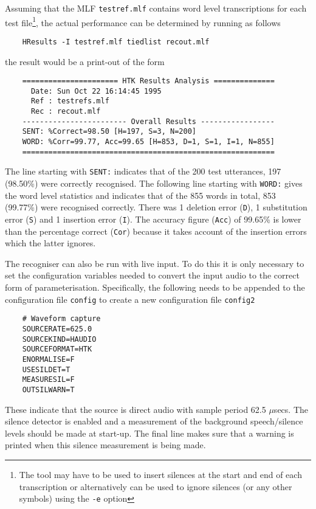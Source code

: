 Assuming that the MLF \texttt{testref.mlf} contains word level transcriptions
for each test file\footnote{The  tool may have to be used to insert silences 
at the start and end of each transcription or alternatively
 can be used to ignore silences (or any other symbols) using
the \texttt{-e} option}, the actual
performance can be determined by running 
 as follows
\begin{verbatim}
    HResults -I testref.mlf tiedlist recout.mlf
\end{verbatim}
the result would be a print-out of the form
\begin{verbatim}
    ====================== HTK Results Analysis ==============
      Date: Sun Oct 22 16:14:45 1995
      Ref : testrefs.mlf
      Rec : recout.mlf
    ------------------------ Overall Results -----------------
    SENT: %Correct=98.50 [H=197, S=3, N=200]
    WORD: %Corr=99.77, Acc=99.65 [H=853, D=1, S=1, I=1, N=855]
    ==========================================================
\end{verbatim}
The line starting with \texttt{SENT:} indicates that of the 200 test utterances,
197  (98.50\%) were correctly recognised.  The following line starting with \texttt{WORD:} 
gives the word level statistics and indicates that of the 855 words in total,
853 (99.77\%) were recognised correctly.  There was 1 deletion error (\texttt{D}), 
1 substitution
error (\texttt{S}) and 1 insertion error (\texttt{I}).  The accuracy figure (\texttt{Acc})
of 99.65\% is lower than the percentage correct (\texttt{Cor}) because it takes
account of the insertion errors which the latter ignores.



The recogniser can also be run with live input.  
To do this it is only
necessary to set the configuration variables needed to convert the input
audio to the correct form of  parameterisation.  Specifically, the following
needs to be appended to the configuration file \texttt{config} to
create a new configuration file \texttt{config2}
\begin{verbatim}
    # Waveform capture
    SOURCERATE=625.0
    SOURCEKIND=HAUDIO
    SOURCEFORMAT=HTK
    ENORMALISE=F
    USESILDET=T
    MEASURESIL=F
    OUTSILWARN=T
\end{verbatim}
These indicate that the source is direct audio with sample period 62.5
$\mu$secs.  The silence detector is enabled and a measurement of the background
speech/silence levels should be made at start-up.  The final line makes sure
that a warning is printed when this silence measurement is being made.

